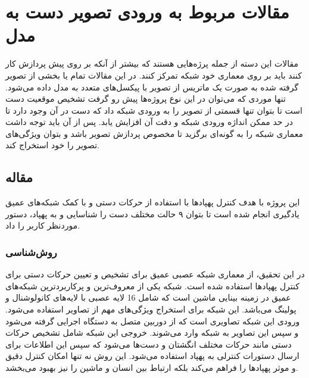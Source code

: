 



\section{مقالات مربوط به ورودی تصویر دست به مدل}
مقالات این دسته از جمله پرژه‌هایی هستند که بیشتر از آنکه بر روی پیش پردازش کار کنند باید بر روی معماری خود شبکه تمرکز کنند. در این مقالات تمام یا بخشی از تصویر گرفته شده به صورت یک ماتریس از تصویر با پیکسل‌های متعدد به مدل داده می‌شود. تنها موردی که می‌توان در این نوع پروژه‌ها پیش رو گرفت تشخیص موقعیت دست است تا بتوان تنها قسمتی از تصویر را به ورودی شبکه داد که دست در آن وجود دارد تا در حد ممکن
 انداژه ورودی شبکه و دقت آن افزایش یابد. پس از آن باید توجه داشت معماری شبکه را به گونه‌ای برگزید تا مخصوص پردازش تصویر باشد و بتوان ویژگی‌های تصویر را خود استخراج کند.


\subsection{مقاله }
این پروژه با هدف کنترل پهپادها با استفاده از حرکات دستی و با کمک شبکه‌های عمیق یادگیری انجام شده است تا بتوان ۹ حالت مختلف دست را شناسایی و به پهپاد، دستور موردنظر کاربر را داد.


\subsubsection{روش‌شناسی}
در این تحقیق، از معماری شبکه عصبی عمیق  برای تشخیص و تعیین حرکات دستی برای کنترل پهپادها استفاده شده است. شبکه  یکی از معروف‌ترین و پرکاربردترین شبکه‌های عمیق در زمینه بینایی ماشین است که 
شامل 16 لایه عصبی با لایه‌های کانولوشنال و پولینگ می‌باشد. این شبکه برای استخراج ویژگی‌های مهم از تصاویر استفاده می‌شود. ورودی این شبکه تصاویری است که از دوربین متصل به دستگاه اجرایی گرفته می‌شود و سپس این 
تصاویر به شبکه وارد می‌شوند. خروجی این شبکه شامل تشخیص حرکات دستی مانند حرکات مختلف انگشتان و دست‌ها می‌شود که سپس این اطلاعات برای ارسال دستورات کنترلی به پهپاد استفاده می‌شود. این روش نه تنها امکان کنترل دقیق 
و موثر پهپادها را فراهم می‌کند بلکه ارتباط بین انسان و ماشین را نیز بهبود می‌بخشد.

